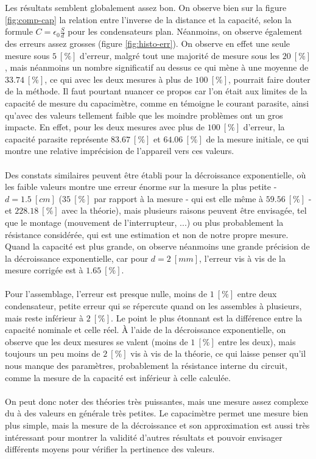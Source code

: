 \documentclass[11pt]{article}
\begin{document}
Les résultats semblent globalement assez bon. On observe bien sur la figure \ref{fig:comp-cap} la relation entre l'inverse de la distance et la capacité, selon la formule $C = \epsilon_0 \frac{S}{d}$ pour les condensateurs plan. Néanmoins, on observe également des erreurs assez grosses (figure \ref{fig:histo-err}). On observe en effet une seule mesure sous $5 \ [\%]$ d'erreur, malgré tout une majorité de mesure sous les $20 \ [\%]$, mais néanmoins un nombre significatif au dessus ce qui mène à une moyenne de $33.74 \ [\%]$, ce qui avec les deux mesures à plus de $100 \ [\%]$, pourrait faire douter de la méthode. Il faut pourtant nuancer ce propos car l'on était aux limites de la capacité de mesure du capacimètre, comme en témoigne le courant parasite, ainsi qu'avec des valeurs tellement faible que les moindre problèmes ont un gros impacte. En effet, pour les deux mesures avec plus de $100 \ [\%]$ d'erreur, la capacité parasite représente $83.67 \ [\%]$ et $64.06 \ [\%]$ de la mesure initiale, ce qui montre une relative imprécision de l'appareil vers ces valeurs. \\ \\
Des constats similaires peuvent être établi pour la décroissance exponentielle, où les faible valeurs montre une erreur énorme sur la mesure la plus petite - $d = 1.5 \ [cm]$ ($35 \ [\%]$ par rapport à la mesure - qui est elle même à $59.56 \ [\%]$ - et $228.18 \ [\%]$ avec la théorie), mais plusieurs raisons peuvent être envisagée, tel que le montage (mouvement de l'interrupteur, ...) ou plus probablement la résistance considérée, qui est une estimation et non de notre propre mesure. Quand la capacité est plus grande, on observe néanmoins une grande précision de la décroissance exponentielle, car pour $d= 2 \ [mm]$, l'erreur vis à vis de la mesure corrigée est à $1.65 \ [\%]$. \\ \\
Pour l'assemblage, l'erreur est presque nulle, moins de $1 \ [\%]$ entre deux condensateur, petite erreur qui se répercute quand on les assembles à plusieurs, mais reste inférieur à $2 \ [\%]$. Le point le plus étonnant est la différence entre la capacité nominale et celle réel. À l'aide de la décroissance exponentielle, on observe que les deux mesures se valent (moins de $1 \ [\%]$ entre les deux), mais toujours un peu moins de $2 \ [\%]$ vis à vis de la théorie, ce qui laisse penser qu'il nous manque des paramètres, probablement la résistance interne du circuit, comme la mesure de la capacité est inférieur à celle calculée. \\ \\
On peut donc noter des théories très puissantes, mais une mesure assez complexe du à des valeurs en générale très petites. Le capacimètre permet une mesure bien plus simple, mais la mesure de la décroissance et son approximation est aussi très intéressant pour montrer la validité d'autres résultats et pouvoir envisager différents moyens pour vérifier la pertinence des valeurs.
\end{document}
